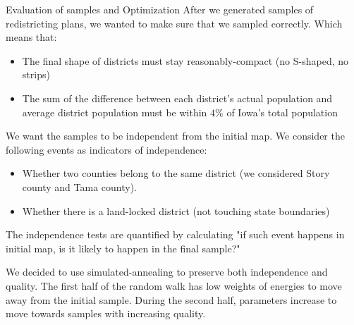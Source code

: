 \documentclass[leqno, handout]{beamer}
\theoremstyle{definition}
\begin{document}
\begin{frame}
\begin{columns}[t]
\begin{column}{.25\linewidth}

\begin{block}{Evaluation of samples and Optimization}
After we generated samples of redistricting plans, we wanted to make sure that we sampled correctly. Which means that:
	\begin{itemize}
    \item The final shape of districts must stay reasonably-compact (no S-shaped, no strips)
    \item The sum of the difference between each district's actual population and average district population must be within $4\%$ of Iowa's total population
	\end{itemize}
We want the samples to be independent from the initial map. We consider the following events as indicators of independence:
	\begin{itemize}
    \item Whether two counties belong to the same district (we considered Story county and Tama county).
    \item Whether there is a land-locked district (not touching state boundaries)
	\end{itemize}
The independence tests are quantified by calculating "if such event happens in initial map, is it likely to happen in the final sample?"

We decided to use simulated-annealing to preserve both independence and quality. The first half of the random walk has low weights of energies to move away from the initial sample. During the second half, parameters increase to move towards samples with increasing quality.
\end{block}



\end{column}
\end{columns}
\end{frame}
\end{document}
